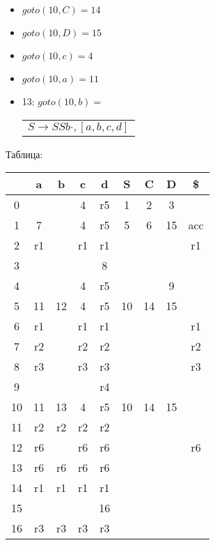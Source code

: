 \documentclass{article}
\begin{document}
\begin{itemize}
    \item $goto(10, C) = 14$
    
    \item $goto(10, D) = 15$
    
    \item $goto(10, c) = 4$    
    
    \item $goto(10, a) = 11$
   
    \item 13: $goto(10, b) =$
    \begin{tabular}{l}
    $S \to SSb \cdot, [a, b, c, d] $ \\
    \end{tabular} 
    \end{itemize}
    Таблица:\\
    \begin{tabular}{c | c | c | c | c | c | c | c | c }
    & a & b & c & d & S & C & D & \$ \\
    \hline
    0 & & & 4 & r5 & 1 & 2 & 3 & \\
    1 & 7 & & 4 & r5 & 5 & 6 & 15 & acc \\
    2 & r1 & & r1 & r1 & & & & r1 \\
    3 & & & & 8 & & & & \\
    4 & & & 4 & r5 & & & 9 & \\
    5 & 11 & 12 & 4 & r5 & 10 & 14 & 15 & \\
    6 & r1 &  & r1 & r1 & & & & r1 \\
    7 & r2 & & r2 & r2 & & & & r2 \\
    8 & r3 & & r3 & r3 & & & & r3 \\
    9 & & & & r4 & & & & \\
    10 & 11 & 13 & 4 & r5 & 10 & 14 & 15 & \\
    11 & r2 & r2 & r2 & r2 & & & \\
    12 & r6 & & r6 & r6 & & & & r6\\
    13 & r6 & r6 & r6 & r6 & &  & \\
    14 & r1 & r1 & r1 & r1 & & & & \\
    15 &  &  &  & 16 & & & & \\
    16 & r3 & r3 & r3 & r3 & & & & \\
    \end{tabular}
    
\end{document}

